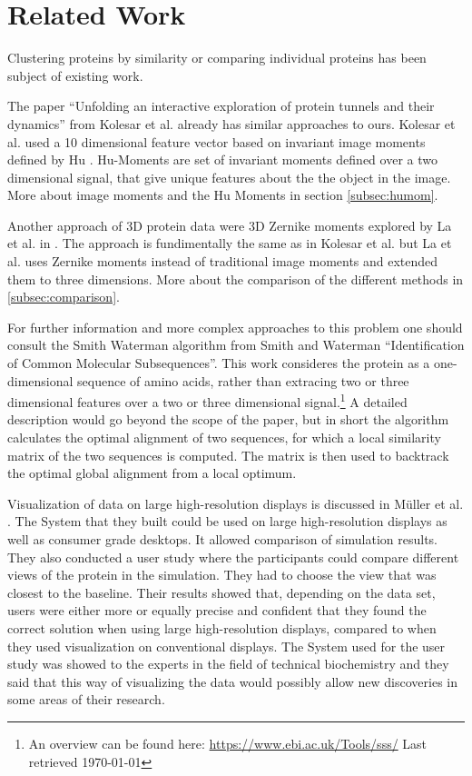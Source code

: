 \documentclass[journal]{vgtc}       %
\begin{document}

\section{Related Work}\label{sec:relatedWork}

Clustering proteins by similarity or comparing individual proteins has been subject of existing work.

The paper ``Unfolding an interactive exploration of protein tunnels and their dynamics'' \cite{kolesar} from Kolesar et al.  already has  similar approaches to ours. Kolesar et al. used a 10 dimensional feature vector based on invariant image moments defined by Hu \cite{humoments}. Hu-Moments are set of invariant moments defined over a two dimensional signal, that give unique features about the the object in the image. More about image moments and the Hu Moments in section \ref{subsec:humom}.


Another approach of  3D protein data were 3D Zernike moments explored by La et al. in \cite{3dsurfer}. The approach is fundimentally the same as in Kolesar et al. but La et al.  uses  Zernike moments instead of traditional image moments and extended them to three dimensions. More about the comparison of the different methods in \ref{subsec:comparison}.
 

For further information and more complex approaches to this problem one should consult the Smith Waterman algorithm from Smith and Waterman ``Identification of Common Molecular Subsequences''\cite{smithwater}. This work consideres the protein as a one-dimensional sequence of amino acids, rather than extracing two or three dimensional features over a two or three dimensional signal.\footnote{An overview can be found here:  \url{https://www.ebi.ac.uk/Tools/sss/} Last retrieved \today} A detailed description would go beyond the scope of the paper, but in short the algorithm calculates the optimal alignment of two sequences, for which a local similarity matrix of the two sequences is computed. The matrix is then used to backtrack the optimal global alignment from a local optimum. 

Visualization of data on large high-resolution displays is discussed in M{\"u}ller et al. \cite{powerwall}. The System that they built could be used on large high-resolution displays as well as consumer grade desktops. It allowed comparison of simulation results. They also conducted a user study where the participants could compare different views of the protein in the simulation. They had to choose the view that was closest to the baseline. Their results showed that, depending on the data set, users were either more or equally precise and confident that they found the correct solution when using large high-resolution displays, compared to when they used visualization on conventional displays. The System used for the user study was showed to the experts in the field of technical biochemistry and they said that this way of visualizing the data would possibly allow new discoveries in some areas of their research.
\end{document}
